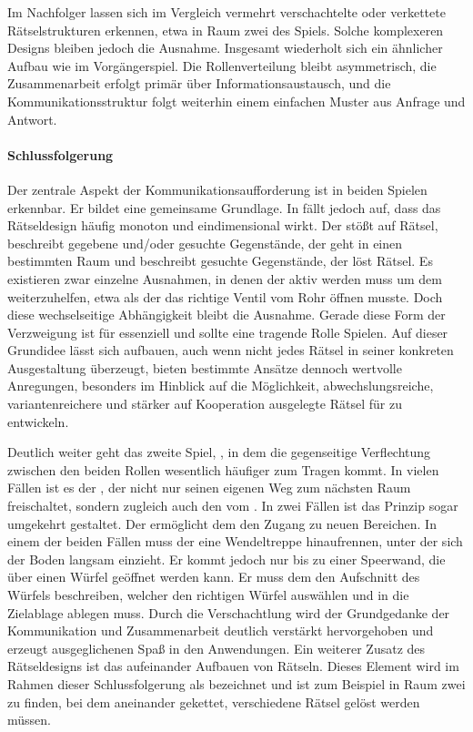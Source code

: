 Im Nachfolger  lassen sich im Vergleich vermehrt verschachtelte oder verkettete Rätselstrukturen erkennen, etwa in Raum zwei des Spiels. Solche komplexeren Designs bleiben jedoch die Ausnahme. Insgesamt wiederholt sich ein ähnlicher Aufbau wie im Vorgängerspiel. Die Rollenverteilung bleibt asymmetrisch, die Zusammenarbeit erfolgt primär über Informationsaustausch, und die Kommunikationsstruktur folgt weiterhin einem einfachen Muster aus Anfrage und Antwort.

\paragraph{Schlussfolgerung}
Der zentrale Aspekt der Kommunikationsaufforderung ist in beiden Spielen erkennbar. Er bildet eine gemeinsame Grundlage. In  fällt jedoch auf, dass das Rätseldesign häufig monoton und eindimensional wirkt. Der  stößt auf Rätsel, beschreibt gegebene und/oder gesuchte Gegenstände, der  geht in einen bestimmten Raum und beschreibt gesuchte Gegenstände, der  löst Rätsel. Es existieren zwar einzelne Ausnahmen, in denen der  aktiv werden muss um dem  weiterzuhelfen, etwa als der das richtige Ventil vom Rohr öffnen musste. Doch diese wechselseitige Abhängigkeit bleibt die Ausnahme. Gerade diese Form der Verzweigung ist für  essenziell und sollte eine tragende Rolle Spielen. Auf dieser Grundidee lässt sich aufbauen, auch wenn nicht jedes Rätsel in seiner konkreten Ausgestaltung überzeugt, bieten bestimmte Ansätze dennoch wertvolle Anregungen, besonders im Hinblick auf die Möglichkeit, abwechslungsreiche, variantenreichere und stärker auf Kooperation ausgelegte Rätsel für  zu entwickeln.

Deutlich weiter geht das zweite Spiel, , in dem die gegenseitige Verflechtung zwischen den beiden Rollen wesentlich häufiger zum Tragen kommt. In vielen Fällen ist es der , der nicht nur seinen eigenen Weg zum nächsten Raum freischaltet, sondern zugleich auch den vom . In zwei Fällen ist das Prinzip sogar umgekehrt gestaltet. Der  ermöglicht dem  den Zugang zu neuen Bereichen. In einem der beiden Fällen muss der  eine Wendeltreppe hinaufrennen, unter der sich der Boden langsam einzieht. Er kommt jedoch nur bis zu einer Speerwand, die über einen Würfel geöffnet werden kann. Er muss dem  den Aufschnitt des Würfels beschreiben, welcher den richtigen Würfel auswählen und in die Zielablage ablegen muss. Durch die Verschachtlung wird der Grundgedanke der Kommunikation und Zusammenarbeit deutlich verstärkt hervorgehoben und erzeugt ausgeglichenen Spaß in den Anwendungen. Ein weiterer Zusatz des Rätseldesigns ist das aufeinander Aufbauen von Rätseln. Dieses Element wird im Rahmen dieser Schlussfolgerung als  bezeichnet und ist zum Beispiel in Raum zwei zu finden, bei dem aneinander gekettet, verschiedene Rätsel gelöst werden müssen.

